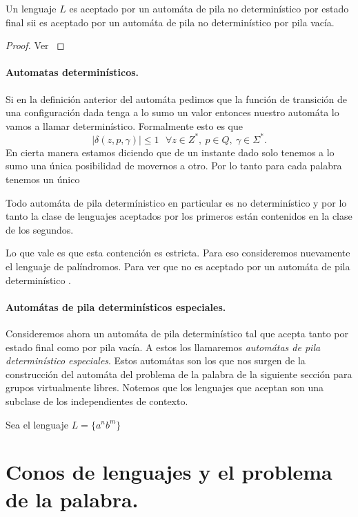 \documentclass[tesis.tex]{subfiles}
\newcommand{\APD}{automáta de pila determinístico }
\begin{document}
\medskip
\begin{teo}
Un lenguaje $L$ es aceptado por un automáta de pila no determinístico por estado final sii es aceptado por un automáta de pila no determinístico por pila vacía.
\end{teo}

\begin{proof}
	Ver \cite{}
\end{proof}

\paragraph{Automatas determinísticos.} Si en la definición anterior del automáta pedimos que la función de transición de una configuración dada tenga a lo sumo un valor entonces nuestro automáta lo vamos a llamar determinístico. Formalmente esto es que 
\[
|\delta(z,p,\gamma)| \le 1 \ \ \ \forall z \in Z^*, \ p \in Q, \ \gamma \in \Sigma^{*}.
\]
En cierta manera estamos diciendo que de un instante dado solo tenemos a lo sumo una única posibilidad de movernos a otro. Por lo tanto para cada palabra tenemos un único
\begin{obs}
	Todo automáta de pila determínistico en particular es no determinístico y por lo tanto la clase de lenguajes aceptados por los primeros están contenidos en la clase de los segundos.
\end{obs}

Lo que vale es que esta contención es estricta. Para eso consideremos nuevamente el lenguaje de palíndromos. Para ver que no es aceptado por un \APD.

\paragraph{Automátas de pila determinísticos especiales.} Consideremos ahora un \APD tal que acepta tanto por estado final como por pila vacía. A estos los llamaremos \textit{automátas de pila determinístico especiales}.  
Estos automátas son los que nos surgen de la construcción del automáta del problema de la palabra de la siguiente sección para grupos virtualmente libres. Notemos que los lenguajes que aceptan son una subclase de los independientes de contexto. 

\begin{ej}
	Sea el lenguaje $L = \{ a^n b^m   \}$
\end{ej}


\section{Conos de lenguajes y el problema de la palabra.}
\end{document}
